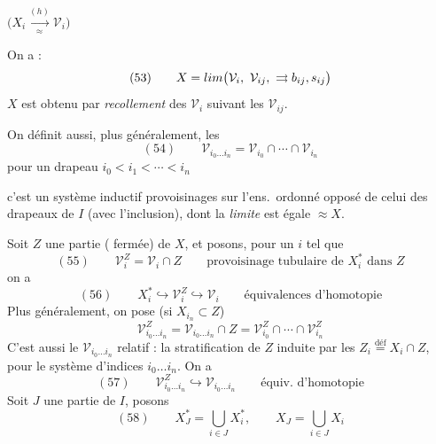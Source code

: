 \documentclass[11pt,a4paper]{article}
\begin{document}

$\bigl(X_i\xrightarrow[\approx]{(h)}\mathcal V_i\bigr)$



On a :
\[
(53)\qquad X=\varinjlim\bigl(\mathcal V_i,\ \mathcal V_{ij},\ \rightrightarrows b_{ij},s_{ij}\bigr)
\]
$X$ est obtenu par \emph{recollement} des $\mathcal V_i$ suivant les $\mathcal V_{ij}$.

On définit aussi, plus généralement, les
\[
(54)\qquad \mathcal V_{i_0\ldots i_n}=\mathcal V_{i_0}\cap\cdots\cap \mathcal V_{i_n}
\]
pour un drapeau $i_0<i_1<\cdots<i_n$



c'est un système inductif \ill{} provoisinages sur l'ens.\ ordonné opposé de celui des drapeaux de $I$ (avec l'inclusion), dont la \emph{limite} est égale $\approx X$.

Soit $Z$ \struck{\ill{}} une partie ( fermée) de $X$, et posons, pour \struck{\ill{}} un $i$ tel que 
\[
(55)\qquad \mathcal V_i^{Z}=\mathcal V_i\cap Z\qquad\text{provoisinage tubulaire de } X_i^{*} \text{ dans } Z
\]
 on a
\[
(56)\qquad X_i^{*}\hookrightarrow \mathcal V_i^{Z}\hookrightarrow \mathcal V_i\qquad\text{équivalences d'homotopie}
\]
Plus généralement, on pose (si $X_{i_n}\subset Z$)
\[
\mathcal V^{Z}_{i_0\ldots i_n}=\mathcal V_{i_0\ldots i_n}\cap Z=\mathcal V^{Z}_{i_0}\cap\cdots\cap \mathcal V^{Z}_{i_n}
\]
C'est aussi le $\mathcal V_{i_0\ldots i_n}$ relatif : la \struck{\ill{}} stratification de $Z$ induite par les $Z_i\overset{\text{déf}}{=}X_i\cap Z$, pour le système d'indices $i_0\ldots i_n$. On a
\[
(57)\qquad \mathcal V^{Z}_{i_0\ldots i_n}\hookrightarrow \mathcal V_{i_0\ldots i_n}\qquad\text{équiv.\ d'homotopie}
\]
Soit $J$ une partie de $I$, posons
\[
(58)\qquad X_J^{*}=\bigcup_{i\in J}X_i^{*},\qquad X_J=\bigcup_{i\in J}X_i
\]
\end{document}
